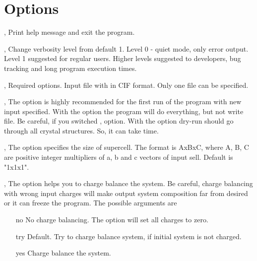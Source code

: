 \documentclass[a4paper,english]{article}
\begin{document}
\section{Options}
\begin{Description}

\item[\Opt{-h}, \Opt{\Dd help}]
      Print help message and exit the program.

\item[\OptArg{-v }{level}, \OptArg{\Dd verbose=}{level}] 
      Change verbosity level from default 1. Level 0 - quiet mode, only error output. Level 1 suggested for regular users. Higher levels suggested to developers, bug tracking and long program execution times. 

\item[\OptArg{-i }{input-file}, \OptArg{\Dd input=}{input-file}]
      Required options. Input file with in CIF format. Only one file can be specified.

\item[\Opt{-d}, \Opt{\Dd dry-run}]
      The option is highly recommended for the first run of the program with new input specified. 
      With the option the program will do everything, but not write file. Be careful, if you switched ,  option. With the option dry-run should go through all crystal structures. So, it can take time.

\item[\OptArg{-s }{cell-size}, \OptArg{\Dd cell-size=}{cell-size}]
      The option specifies the size of supercell. The format is AxBxC, where A, B, C are positive integer multipliers of a, b and c vectors of input sell. Default is "1x1x1".

\item[\OptArg{-c }{balance-type}, \OptArg{\Dd charge-balance=}{balance-type}]
      The option helps you to charge balance the system. Be careful, charge balancing with wrong input charges will make output system composition far from desired or it can freeze the program. The possible arguments are
      \begin{itemize}
         \item[no]   No charge balancing. The option will set all charges to zero.
         \item[try]  Default. Try to charge balance system, if initial system is not charged.
         \item[yes]  Charge balance the system.
      \end{itemize}


\end{Description}
\end{document}
